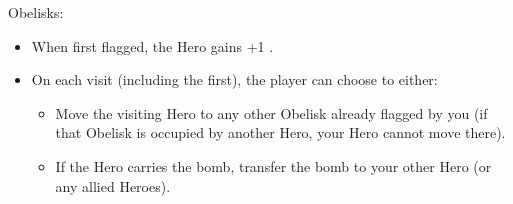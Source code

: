 \begin{multicols}{2}
Obelisks:

\begin{itemize}
  \item When first flagged, the Hero gains +1 .
  \item On each visit (including the first), the player can choose to either:
  \begin{itemize}
    \item Move the visiting Hero to any other Obelisk already flagged by you (if that Obelisk is occupied by another Hero, your Hero cannot move there).
    \item If the Hero carries the bomb, transfer the bomb to your other Hero (or any allied Heroes).
  \end{itemize}
\end{itemize}

\end{multicols}


\newpage

